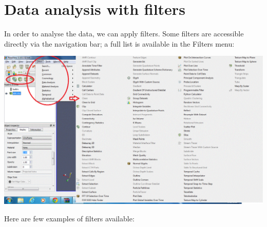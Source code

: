  

\hypertarget{index_filters}{}\section{Data analysis with filters}\label{index_filters}
In order to analyse the data, we can apply filters. Some filters are accessible directly via the navigation bar; a full list is available in the {\ttfamily Filters} menu\+:

 
\begin{DoxyImageNoCaption}
  \mbox{\includegraphics[width=\textwidth]{paraview06}}
\end{DoxyImageNoCaption}


Here are few examples of filters available\+:


